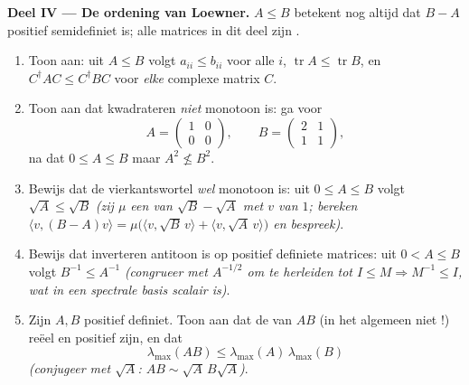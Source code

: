 \begin{problem}
\medskip
\noindent\textbf{Deel IV --- De ordening van Loewner.} $A \leq B$
betekent nog altijd dat $B - A$ positief semidefiniet is; alle
matrices in dit deel zijn .
\begin{enumerate}[resume]
  \item Toon aan: uit $A \leq B$ volgt $a_{ii} \leq b_{ii}$ voor
        alle $i$, $\operatorname{tr} A \leq \operatorname{tr} B$,
        en $C^\dagger AC \leq C^\dagger BC$ voor \emph{elke}
        complexe matrix $C$.
  \item Toon aan dat kwadrateren \emph{niet} monotoon is: ga voor
        \[
        A = \begin{pmatrix} 1 & 0\\ 0 & 0\end{pmatrix},
        \qquad
        B = \begin{pmatrix} 2 & 1\\ 1 & 1\end{pmatrix},
        \]
        na dat $0 \leq A \leq B$ maar $A^2 \not\leq B^2$.
  \item Bewijs dat de vierkantswortel \emph{wel} monotoon is: uit
        $0 \leq A \leq B$ volgt $\sqrt A \leq \sqrt B$ \emph{(zij
        $\mu$ een  van $\sqrt B - \sqrt A$ met
         $v$ van  $1$; bereken $\langle v, (B -
        A)v\rangle = \mu\bigl(\langle v, \sqrt B\,v\rangle +
        \langle v, \sqrt A\,v\rangle\bigr)$ en bespreek)}.
  \item Bewijs dat inverteren antitoon is op positief definiete
        matrices: uit $0 < A \leq B$ volgt $B^{-1} \leq A^{-1}$
        \emph{(congrueer met $A^{-1/2}$ om te herleiden tot $I
        \leq M \Rightarrow M^{-1} \leq I$, wat in een spectrale
        basis scalair is)}.
  \item Zijn $A, B$ positief definiet. Toon aan dat de
         van $AB$ (in het algemeen niet !)
        reëel en positief zijn, en dat
        \[
        \lambda_{\max}(AB) \leq
        \lambda_{\max}(A)\,\lambda_{\max}(B)
        \]
        \emph{(conjugeer met $\sqrt A$: $AB \sim \sqrt
        A\,B\sqrt A$)}.
\end{enumerate}


\end{problem}
